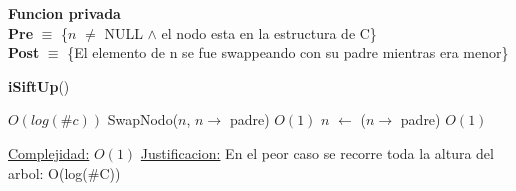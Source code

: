 \begin{Algoritmos}
$ $\newline


\textbf{Funcion privada}\\
\textbf{Pre} $\equiv$ \{$n$ $\neq$ NULL $\land$ el nodo esta en la estructura de C\}\\%
\textbf{Post} $\equiv$ \{El elemento de n se fue swappeando con su padre mientras era menor\}%
\begin{algorithm}[H]
{\textbf{iSiftUp}()}
\begin{algorithmic}[1]

     \Comment $O(log(\#c))$
        \State SwapNodo($n$, $n \to$ padre) \Comment $O(1)$
        \State $n$ $\gets$ ($n \to$ padre) \Comment $O(1)$
    \EndWhile

    \medskip
    \Statex \underline{Complejidad:} $O(1)$
    \Statex \underline{Justificacion:} En el peor caso se recorre toda la altura del arbol: O(log($\#$C))
\end{algorithmic}
\end{algorithm}




\end{Algoritmos}
